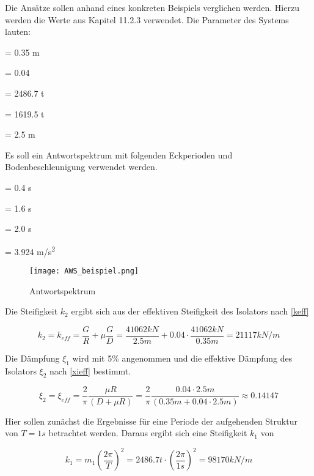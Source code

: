 Die Ansätze sollen anhand eines konkreten Beispiels verglichen werden. Hierzu werden die Werte aus \cite{Isemann} Kapitel 11.2.3 verwendet.
Die Parameter des Systems lauten:

    = 0.35 m \par
\makebox[1cm]{$\mu$}  = 0.04\par
{}  = 2486.7 t\par
{}  = 1619.5 t\par
{}    = 2.5 m\par

Es soll ein Antwortspektrum mit folgenden Eckperioden und Bodenbeschleunigung verwendet werden.

  = 0.4 s\par
{}  = 1.6 s\par
{}  = 2.0 s\par
{}  = 3.924 m/s\textsuperscript{2}\par

\begin{figure}[H]
    \centering
    \texttt{[image: AWS\_beispiel.png]}
    \caption{Antwortspektrum}
\end{figure}

Die Steifigkeit $k_2$ ergibt sich aus der effektiven Steifigkeit des Isolators nach \cref{keff}

\begin{equation*}
k_2 = k_{eff} = \frac{G}{R} + \mu \frac{G}{D} = \frac{41062 kN}{2.5 m} + 0.04 \cdot \frac{41062 kN}{0.35 m} = 21117 kN/m
\end{equation*}

Die Dämpfung $\xi_1$ wird mit 5\% angenommen und die effektive Dämpfung des Isolators $\xi_2$ nach \cref{xieff} bestimmt.

\begin{equation*}
\xi_2 = \xi_{eff} = \frac{2}{\pi} \frac{\mu R}{(D + \mu R)} = \frac{2}{\pi} \frac{0.04 \cdot 2.5 m}{(0.35 m + 0.04 \cdot 2.5 m)} \approx 0.14147
\end{equation*}

Hier sollen zunächst die Ergebnisse für eine Periode der aufgehenden Struktur von $T = 1 s$ betrachtet werden. Daraus ergibt sich eine Steifigkeit $k_1$ von

\begin{equation*}
k_1 = m_1 (\frac{2 \pi}{T})^2 = 2486.7 t \cdot (\frac{2 \pi}{1 s})^2 = 98170 kN/m
\end{equation*}

